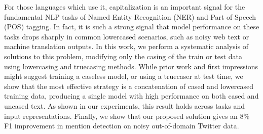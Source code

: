 For those languages which use it, capitalization is an important signal for the fundamental NLP tasks of Named Entity Recognition (NER) and Part of Speech (POS) tagging. In fact, it is such a strong signal that model performance on these tasks drops sharply in common lowercased scenarios, such as noisy web text or machine translation outputs. In this work, we perform a systematic analysis of solutions to this problem, modifying only the casing of the train or test data using lowercasing and truecasing methods. While prior work and first impressions might suggest training a caseless model, or using a truecaser at test time, we show that the most effective strategy is a concatenation of cased and lowercased training data, producing a single model with high performance on both cased and uncased text. As shown in our experiments, this result holds across tasks and input representations. Finally, we show that our proposed solution gives an 8\% F1 improvement in mention detection on noisy out-of-domain Twitter data.